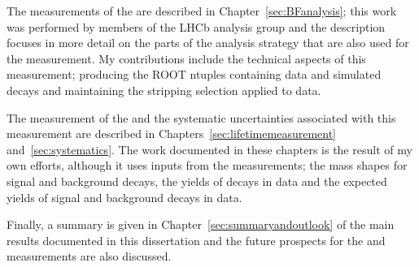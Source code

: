 The measurements of the \bmumu \BFs are described in Chapter~\ref{sec:BFanalysis}; this work was performed by members of the \bmumu LHCb analysis group and the description focuses in more detail on the parts of the analysis strategy that are also used for the \el measurement. My contributions include the technical aspects of this measurement; producing the ROOT ntuples containing data and simulated decays and maintaining the stripping selection applied to data. 

The measurement of the \bsmumu \el and the systematic uncertainties associated with this measurement are described in Chapters~\ref{sec:lifetimemeasurement} and~\ref{sec:systematics}. 
The work documented in these chapters is the result of my own efforts, although it uses inputs from the \BF measurements; the mass shapes for signal and background decays, the yields of \bsjpsiphi decays in data and the expected yields of signal and background decays in data. %

Finally, a summary is given in Chapter~\ref{sec:summaryandoutlook} of the main results documented in this dissertation and the future prospects for the \BF and \el measurements are also discussed. 

